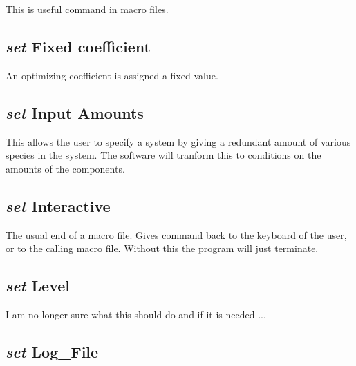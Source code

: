 \documentclass[12pt]{article}
\begin{document}
This is useful command in macro files.

\subsection{{\em set} Fixed coefficient}

An optimizing coefficient is assigned a fixed value.

\subsection{{\em set} Input Amounts}

This allows the user to specify a system by giving a redundant amount
of various species in the system.  The software will tranform this to
conditions on the amounts of the components.

\subsection{{\em set} Interactive}

The usual end of a macro file.  Gives command back to the keyboard of
the user, or to the calling macro file.  Without this the program will
just terminate.

\subsection{{\em set} Level}

I am no longer sure what this should do and if it is needed ...

\subsection{{\em set} Log\_File}
\end{document}
